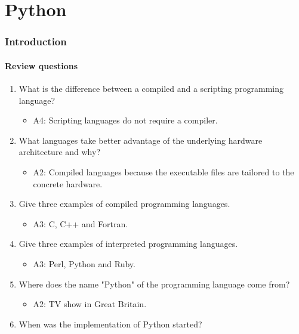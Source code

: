 \documentclass[article,A4,12pt]{llncs}
\begin{document}

\part{Python}

\setcounter{section}{0}
\section{Introduction}

\subsection{Review questions}

\begin{enumerate}
\item What is the difference between a compiled and a scripting programming language?
  \begin{itemize}
    \item A4: Scripting languages do not require a compiler.
  \end{itemize}
\item What languages take better advantage of the underlying hardware architecture
      and why?
  \begin{itemize}
    \item A2: Compiled languages because the executable files are tailored 
          to the concrete hardware.
  \end{itemize}
\item Give three examples of compiled programming languages.
  \begin{itemize}
    \item A3: C, C++ and Fortran.
  \end{itemize}
\item Give three examples of interpreted programming languages.
  \begin{itemize}
    \item A3: Perl, Python and Ruby. 
  \end{itemize}
\item Where does the name "Python" of the programming language come from?
  \begin{itemize}
    \item A2: TV show in Great Britain.
  \end{itemize}
\item When was the implementation of Python started?

\end{enumerate}
\end{document}

